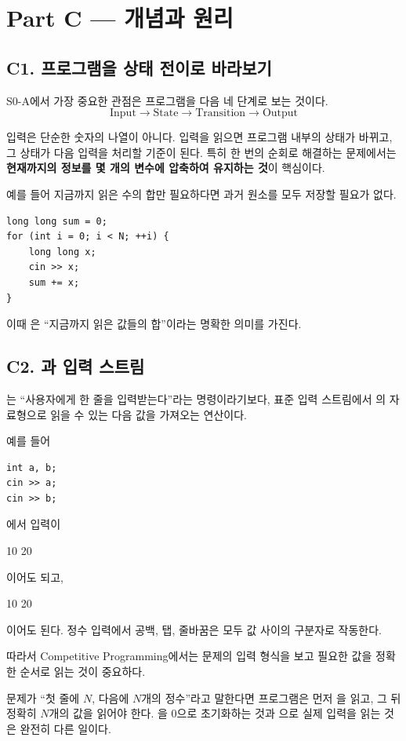 \section{Part C --- 개념과 원리}

\subsection{C1. 프로그램을 상태 전이로 바라보기}
S0-A에서 가장 중요한 관점은 프로그램을 다음 네 단계로 보는 것이다.
\[
\text{Input} \longrightarrow \text{State} \longrightarrow \text{Transition} \longrightarrow \text{Output}
\]

입력은 단순한 숫자의 나열이 아니다. 입력을 읽으면 프로그램 내부의 상태가 바뀌고, 그 상태가 다음 입력을 처리할 기준이 된다. 특히 한 번의 순회로 해결하는 문제에서는 \textbf{현재까지의 정보를 몇 개의 변수에 압축하여 유지하는 것}이 핵심이다.

예를 들어 지금까지 읽은 수의 합만 필요하다면 과거 원소를 모두 저장할 필요가 없다.
\begin{lstlisting}
long long sum = 0;
for (int i = 0; i < N; ++i) {
    long long x;
    cin >> x;
    sum += x;
}
\end{lstlisting}
이때 은 ``지금까지 읽은 값들의 합''이라는 명확한 의미를 가진다.

\subsection{C2. 과 입력 스트림}
는 ``사용자에게 한 줄을 입력받는다''라는 명령이라기보다, 표준 입력 스트림에서 의 자료형으로 읽을 수 있는 다음 값을 가져오는 연산이다.

예를 들어
\begin{lstlisting}
int a, b;
cin >> a;
cin >> b;
\end{lstlisting}
에서 입력이
\begin{TextBlock}
10 20
\end{TextBlock}
이어도 되고,
\begin{TextBlock}
10
20
\end{TextBlock}
이어도 된다. 정수 입력에서 공백, 탭, 줄바꿈은 모두 값 사이의 구분자로 작동한다.

따라서 Competitive Programming에서는 문제의 입력 형식을 보고 필요한 값을 정확한 순서로 읽는 것이 중요하다.

\begin{conceptbox}[입력 계약]
문제가 ``첫 줄에 $N$, 다음에 $N$개의 정수''라고 말한다면 프로그램은 먼저 을 읽고, 그 뒤 정확히 $N$개의 값을 읽어야 한다. 을 0으로 초기화하는 것과 으로 실제 입력을 읽는 것은 완전히 다른 일이다.
\end{conceptbox}

